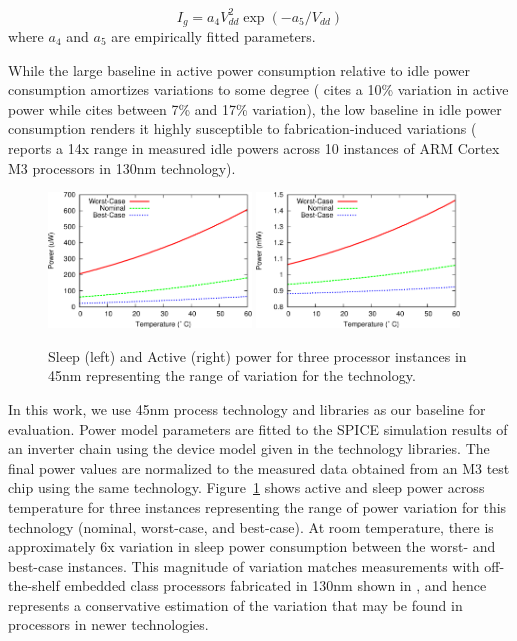 \begin{equation}
I_{g} = a_{4} V_{dd}^2 \exp(-a_{5}/V_{dd})
\end{equation}
%
where $a_{4}$ and $a_5$ are empirically fitted parameters.



While the large baseline in active power consumption relative to idle power consumption amortizes  variations to some degree (\cite{Wanner:2012} cites a 10\% variation in active power while \cite{balaji2012} cites between 7\% and 17\% variation), the low baseline in idle power consumption renders it highly susceptible to fabrication-induced variations (\cite{Wanner:2012} reports a 14x range in measured idle powers across 10 instances of ARM Cortex M3 processors in 130nm technology). 

\begin{figure}
\centering
\includegraphics[width=0.48\textwidth]{figures/sleep_power}
\includegraphics[width=0.48\textwidth]{figures/active_power}

\caption{\label{fig:power}Sleep (left) and Active (right) power for three processor instances in 45nm representing the range of variation for the technology.}
\end{figure}


In this work, we use 45nm process technology and libraries as our baseline for evaluation. Power model parameters are fitted to the SPICE simulation results of an inverter chain using the device model given in the technology libraries.  The final power values are normalized to the measured data obtained from an M3 test chip using the same technology. Figure~\ref{fig:power} shows active and sleep power across temperature for three instances representing the range of power variation for this technology (nominal, worst-case, and best-case).  At room temperature, there is approximately 6x variation in sleep power consumption between the worst- and best-case instances. This magnitude of variation matches measurements with off-the-shelf embedded class processors fabricated in 130nm shown in \cite{Wanner:2012}, and hence represents a conservative estimation of the variation that may be found in processors in newer technologies. 

